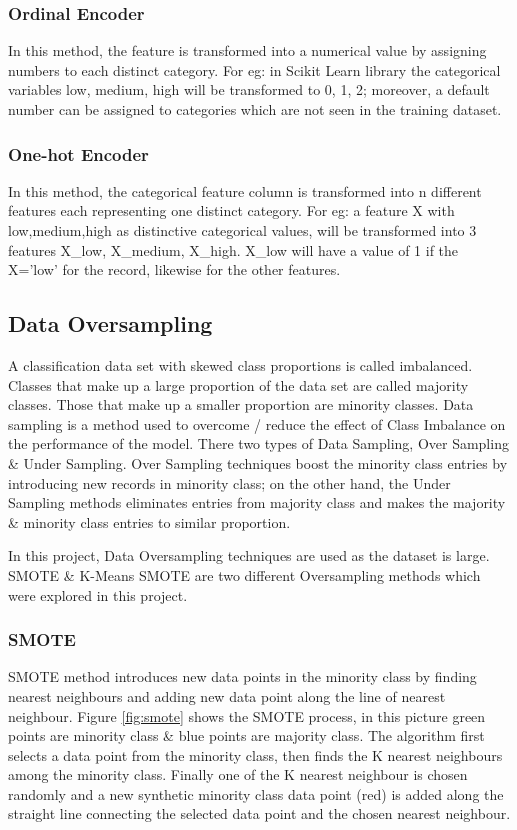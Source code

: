 \documentclass[twoside,11pt,a4paper]{article}
\begin{document}
\subsubsection{Ordinal Encoder}
In this method, the feature is transformed into a numerical value by assigning numbers to each distinct category. For eg: in Scikit Learn library the categorical variables low, medium, high will be transformed to 0, 1, 2; moreover, a default number can be assigned to categories which are not seen in the training dataset. 
\subsubsection{One-hot Encoder}
In this method, the categorical feature column is transformed into n different features each representing one distinct category. For eg: a feature X with low,medium,high as distinctive categorical values, will be transformed into 3 features X\_low, X\_medium, X\_high. X\_low will have a value of 1 if the X='low' for the record, likewise for the other features.
\subsection{Data Oversampling}
A classification data set with skewed class proportions is called imbalanced. Classes that make up a large proportion of the data set are called majority classes. Those that make up a smaller proportion are minority classes. Data sampling is a method used to overcome / reduce the effect of Class Imbalance on the performance of the model. There two types of Data Sampling, Over Sampling \& Under Sampling. Over Sampling techniques boost the minority class entries by introducing new records in minority class; on the other hand, the Under Sampling methods eliminates entries from majority class and makes the majority \& minority class entries to similar proportion.

In this project, Data Oversampling techniques are used as the dataset is large. \acf{SMOTE} \citep{chawla2002smote} \&  K-Means \acs{SMOTE} \citep{last2017oversampling} are two different Oversampling methods which were explored in this project.

\subsubsection{\acf{SMOTE}}
\acs{SMOTE} method introduces new data points in the minority class by finding nearest neighbours and adding new data point along the line of nearest neighbour. Figure \ref{fig:smote} shows the \acs{SMOTE} process, in this picture green points are minority class \&  blue points are majority class. The algorithm first selects a data point from the minority class, then finds the K nearest neighbours among the minority class. Finally one of the K nearest neighbour is chosen randomly and a new synthetic minority class data point (red) is added along the straight line connecting the selected data point and the chosen nearest neighbour.\\
\end{document}
